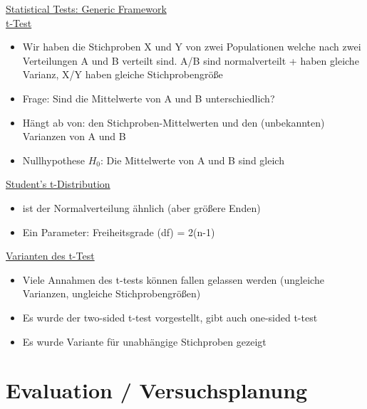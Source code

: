 \documentclass[a4paper,10pt,oneside]{article}
\begin{document}
\underline{Statistical Tests: Generic Framework} \\
 
\underline{t-Test} \\
 	\begin{itemize}
 		\item Wir haben die Stichproben X und Y von zwei Populationen welche nach zwei Verteilungen A und B verteilt sind. A/B sind normalverteilt + haben gleiche Varianz, X/Y haben gleiche Stichprobengröße
 		\item Frage: Sind die Mittelwerte von A und B unterschiedlich?
 		\item Hängt ab von: den Stichproben-Mittelwerten und den (unbekannten) Varianzen von A und B
 		\item Nullhypothese $H_0$: Die Mittelwerte von A und B sind gleich
 	\end{itemize}
 	
\underline{Student's t-Distribution} \\
 	\begin{itemize}
 		\item ist der Normalverteilung ähnlich (aber größere Enden)
 		\item Ein Parameter: Freiheitsgrade (df) = 2(n-1)
 	\end{itemize}
 		
\underline{Varianten des t-Test} \\
 	\begin{itemize}
 		\item Viele Annahmen des t-tests können fallen gelassen werden (ungleiche Varianzen, ungleiche Stichprobengrößen)
 		\item Es wurde der two-sided t-test vorgestellt, gibt auch one-sided t-test
 		\item Es wurde Variante für unabhängige Stichproben gezeigt
 	\end{itemize}

\section{Evaluation / Versuchsplanung}	
\end{document}
